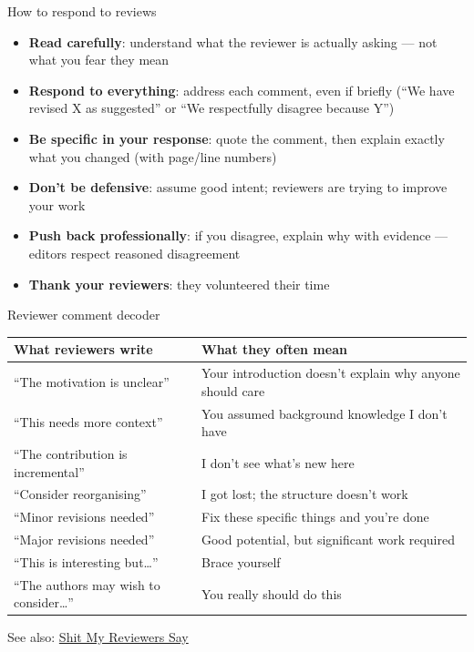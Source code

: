 \documentclass[aspectratio=169]{beamer}
\begin{document}
\begin{frame}{How to respond to reviews}
\begin{itemize}
  \item \textbf{Read carefully}: understand what the reviewer is actually asking — not what you fear they mean
  \item \textbf{Respond to everything}: address each comment, even if briefly (``We have revised X as suggested'' or ``We respectfully disagree because Y'')
  \item \textbf{Be specific in your response}: quote the comment, then explain exactly what you changed (with page/line numbers)
  \item \textbf{Don't be defensive}: assume good intent; reviewers are trying to improve your work
  \item \textbf{Push back professionally}: if you disagree, explain why with evidence — editors respect reasoned disagreement
  \item \textbf{Thank your reviewers}: they volunteered their time
\end{itemize}
\end{frame}

\begin{frame}{Reviewer comment decoder}
\small
\begin{tabular}{p{}p{}}
\textbf{What reviewers write} & \textbf{What they often mean} \\
\midrule
\addlinespace
``The motivation is unclear'' & Your introduction doesn't explain why anyone should care \\
``This needs more context'' & You assumed background knowledge I don't have \\
``The contribution is incremental'' & I don't see what's new here \\
``Consider reorganising'' & I got lost; the structure doesn't work \\
``Minor revisions needed'' & Fix these specific things and you're done \\
``Major revisions needed'' & Good potential, but significant work required \\
``This is interesting but\ldots'' & Brace yourself \\
``The authors may wish to consider\ldots'' & You really should do this \\
\end{tabular}

\medskip
\small See also: \href{https://shitmyreviewerssay.tumblr.com/}{Shit My Reviewers Say}
\end{frame}
\end{document}
